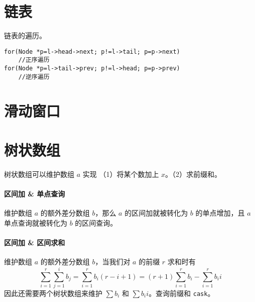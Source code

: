 \documentclass{probook}
\begin{document}
\begin{multicols}{2}
\section{链表}



链表的遍历。

\begin{lstlisting}[style=cpp]
for(Node *p=l->head->next; p!=l->tail; p=p->next)
    //正序遍历
for(Node *p=l->tail->prev; p!=l->head; p=p->prev)
    //逆序遍历
\end{lstlisting}

\section{滑动窗口}



\section{树状数组}

树状数组可以维护数组 $a$ 实现 （1）将某个数加上 $x$。（2）求前缀和。



\paragraph{区间加 \& 单点查询}

维护数组 $a$ 的额外差分数组 $b$，那么 $a$ 的区间加就被转化为 $b$ 的单点增加，且 $a$ 单点查询就被转化为 $b$ 的区间查询。



\paragraph{区间加 \& 区间求和}

维护数组 $a$ 的额外差分数组 $b$，当我们对 $a$ 的前缀 $r$ 求和时有
$$\sum_{i=1}^r \sum_{j=1}^i b_j = \sum_{i=1}^rb_i(r-i+1) = (r+1)\sum_{i=1}^rb_i - \sum_{i=1}^rb_ii$$
因此还需要两个树状数组来维护 $\sum b_i$ 和 $\sum b_ii$。查询前缀和 \verb|cask|。




\end{multicols}
\end{document}
